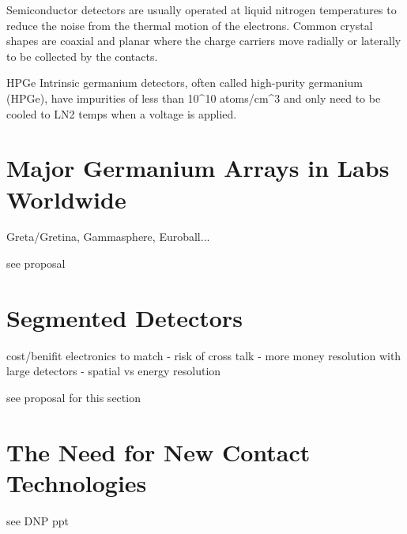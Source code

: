 Semiconductor detectors are usually operated at liquid nitrogen temperatures to reduce the noise from the thermal motion of the electrons. Common crystal shapes are coaxial and planar where the charge carriers move radially or laterally to be collected by the contacts. 

HPGe
Intrinsic germanium detectors, often called high-purity germanium (HPGe), have impurities of less than 10^10 atoms/cm^3 and only need to be cooled to LN2 temps when a voltage is applied. 

\section{Major Germanium Arrays in Labs Worldwide}
\indent Greta/Gretina, Gammasphere, Euroball...

see proposal

\section{Segmented Detectors}
\indent cost/benifit
electronics to match - risk of cross talk - more money
resolution with large detectors - spatial vs energy resolution

see proposal for this section
 
\section{The Need for New Contact Technologies}
\indent 

see DNP ppt

 